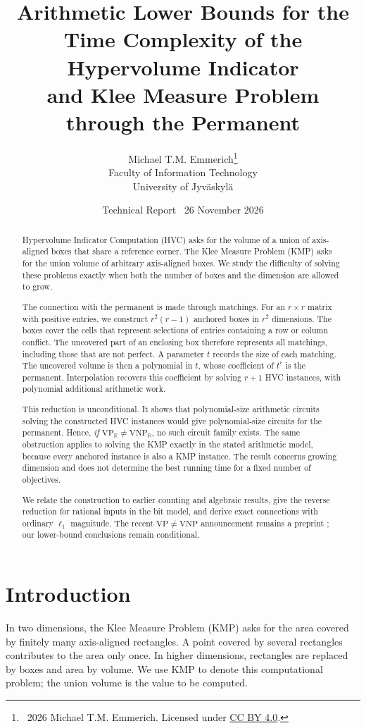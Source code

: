 \documentclass[12pt,a4paper]{article}
\title{Arithmetic Lower Bounds for the\\
Time Complexity of the Hypervolume Indicator\\
and Klee Measure Problem\\
through the Permanent}
\author{Michael T.M. Emmerich\thanks{\textcopyright\ 2026 Michael T.M. Emmerich.
Licensed under \href{https://creativecommons.org/licenses/by/4.0/}{CC BY 4.0}.}\\[0.35em]
\normalsize Faculty of Information Technology\\
\normalsize University of Jyv\"askyl\"a}
\date{Technical Report \textperiodcentered\ 26 November 2026}
\theoremstyle{definition}
\theoremstyle{remark}
\newcommand{\R}{\mathbb R}
\newcommand{\VP}{\mathrm{VP}}
\newcommand{\VNP}{\mathrm{VNP}}
\begin{document}
\maketitle

\begin{abstract}
Hypervolume Indicator Computation (HVC) asks for the volume of a union
of axis-aligned boxes that share a reference corner. The Klee Measure
Problem (KMP) asks for the union volume of arbitrary axis-aligned boxes.
We study the difficulty of solving these problems exactly when both
the number of boxes and the dimension are allowed to grow.

The connection with the permanent is made through matchings. For an
$r\times r$ matrix with positive entries, we construct $r^2(r-1)$
anchored boxes in $r^2$ dimensions. The boxes cover the cells that
represent selections of entries containing a row or column conflict.
The uncovered part of an enclosing box therefore represents all
matchings, including those that are not perfect. A parameter $t$
records the size of each matching. The uncovered volume is then a
polynomial in $t$, whose coefficient of $t^r$ is the permanent.
Interpolation recovers this coefficient by solving $r+1$ HVC instances,
with polynomial additional arithmetic work.

This reduction is unconditional. It shows that polynomial-size
arithmetic circuits solving the constructed HVC instances would give
polynomial-size circuits for the permanent. Hence, \emph{if
$\VP_{\R}\ne\VNP_{\R}$}, no such circuit family exists. The same
obstruction applies to solving the KMP exactly in the stated
arithmetic model, because every anchored instance is also a
KMP instance. The result concerns growing dimension and does
not determine the best running time for a fixed number of objectives.

We relate the construction to earlier counting and algebraic results,
give the reverse reduction for rational inputs in the bit model, and
derive exact connections with ordinary $\ell_1$ magnitude. The recent
$\VP\ne\VNP$ announcement remains a preprint \cite{Claude2026};
our lower-bound conclusions remain conditional.
\end{abstract}

\section{Introduction}
\label{sec:models}

In two dimensions, the Klee Measure Problem (KMP) asks for the area covered
by finitely many axis-aligned rectangles. A point covered by several
rectangles contributes to the area only once. In higher dimensions,
rectangles are replaced by boxes and area by volume. We use KMP to
denote this computational problem; the union volume is the value to be
computed.
\end{document}
